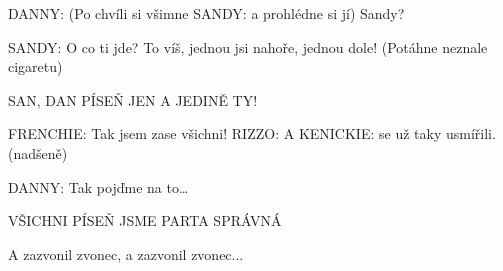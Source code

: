 \rep DANNY:        (Po chvíli si všimne \rep SANDY: a prohlédne si jí) Sandy?

\rep SANDY:        O co ti jde?  To víš, jednou jsi nahoře, jednou dole! (Potáhne neznale         cigaretu)

SAN, DAN        PÍSEŇ JEN A JEDINĚ TY! 





\rep FRENCHIE:        Tak jsem zase všichni! \rep RIZZO: A \rep KENICKIE: se už taky usmířili. (nadšeně) 

\rep DANNY:        Tak pojďme na to…

VŠICHNI        PÍSEŇ JSME PARTA SPRÁVNÁ 

A zazvonil zvonec, a zazvonil zvonec...



\bye

